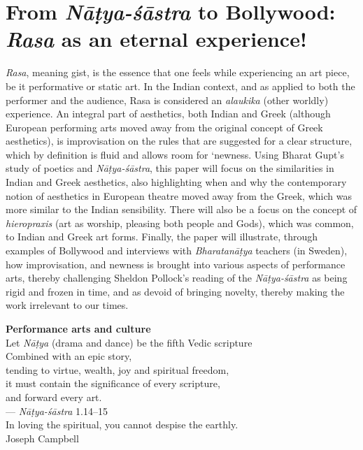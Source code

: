 \chapter[From \textsl{Nāṭya-śāstra} to Bollywood:...]{From \textsl{Nāṭya-śāstra} to Bollywood: \textsl{Rasa} as an eternal experience!}\label{chapter\thechapter:begin}

\textsl{Rasa}, meaning gist, is the essence that one feels while experiencing an art piece, be it performative or static art. In the Indian context, and as applied to both the performer and the audience, Rasa is considered an \textsl{alaukika} (other worldly) experience. An integral part of aesthetics, both Indian and Greek (although European performing arts moved away from the original concept of Greek aesthetics), is improvisation on the rules that are suggested for a clear structure, which by definition is fluid and allows room for ‘newness. Using Bharat Gupt’s study of poetics and \textsl{Nāṭya-śāstra}, this paper will focus on the similarities in Indian and Greek aesthetics, also highlighting when and why the contemporary notion of aesthetics in European theatre moved away from the Greek, which was more similar to the Indian sensibility. There will also be a focus on the concept of \textsl{hieropraxis} (art as worship, pleasing both people and Gods), which was common, to Indian and Greek art forms. Finally, the paper will illustrate, through examples of Bollywood and interviews with \textsl{Bharatanāṭya} teachers (in Sweden), how improvisation, and newness is brought into various aspects of performance arts, thereby challenging Sheldon Pollock’s reading of the \textsl{Nāṭya-śāstra} as being rigid and frozen in time, and as devoid of bringing novelty, thereby making the work irrelevant to our times. 

\newpage

\begin{flushright}
{\bf Performance arts and culture}\\[2pt]
Let \textsl{Nāṭya} (drama and dance) be the fifth Vedic scripture\\[2pt]
Combined with an epic story,\\[2pt]
tending to virtue, wealth, joy and spiritual freedom,\\[2pt]
it must contain the significance of every scripture,\\[2pt]
and forward every art.\\[2pt]
--- \textsl{Nāṭya-śāstra} 1.14--15\\[2pt]
In loving the spiritual, you cannot despise the earthly.\\[2pt]
Joseph Campbell
\end{flushright}

